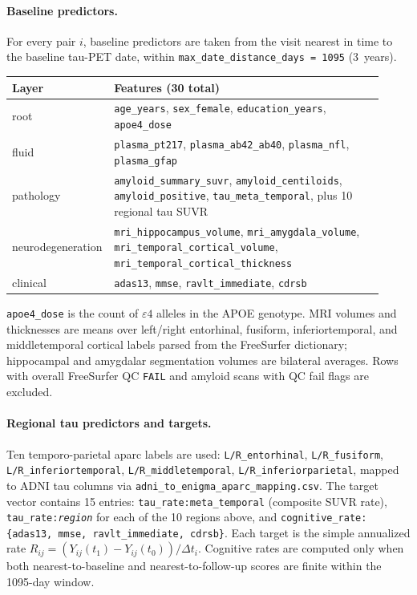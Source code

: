 \documentclass[11pt]{article}
\newcommand{\code}[1]{\texttt{#1}}
\begin{document}
\paragraph{Baseline predictors.} For every pair $i$, baseline predictors are
taken from the visit nearest in time to the baseline tau-PET date, within
\code{max\_date\_distance\_days = 1095} (3~years).

\begin{table}[h]
\centering
\small
\begin{tabular}{>{\raggedright}p{0.20\linewidth} p{0.72\linewidth}}
\toprule
\textbf{Layer} & \textbf{Features (30 total)} \\
\midrule
root & \code{age\_years}, \code{sex\_female}, \code{education\_years}, \code{apoe4\_dose} \\
fluid & \code{plasma\_pt217}, \code{plasma\_ab42\_ab40}, \code{plasma\_nfl}, \code{plasma\_gfap} \\
pathology & \code{amyloid\_summary\_suvr}, \code{amyloid\_centiloids}, \code{amyloid\_positive}, \code{tau\_meta\_temporal}, plus 10 regional tau SUVR \\
neurodegeneration & \code{mri\_hippocampus\_volume}, \code{mri\_amygdala\_volume}, \code{mri\_temporal\_cortical\_volume}, \code{mri\_temporal\_cortical\_thickness} \\
clinical & \code{adas13}, \code{mmse}, \code{ravlt\_immediate}, \code{cdrsb} \\
\bottomrule
\end{tabular}
\end{table}

\code{apoe4\_dose} is the count of $\varepsilon 4$ alleles in the APOE
genotype. MRI volumes and thicknesses are means over left/right entorhinal,
fusiform, inferiortemporal, and middletemporal cortical labels parsed from
the FreeSurfer dictionary; hippocampal and amygdalar segmentation volumes
are bilateral averages. Rows with overall FreeSurfer QC \code{FAIL} and
amyloid scans with QC fail flags are excluded.

\paragraph{Regional tau predictors and targets.} Ten temporo-parietal aparc
labels are used: \code{L/R\_entorhinal}, \code{L/R\_fusiform},
\code{L/R\_inferiortemporal}, \code{L/R\_middletemporal},
\code{L/R\_inferiorparietal}, mapped to ADNI tau columns via
\code{adni\_to\_enigma\_aparc\_mapping.csv}. The target vector contains 15
entries: \code{tau\_rate:meta\_temporal} (composite SUVR rate),
\code{tau\_rate:\textit{region}} for each of the 10 regions above, and
\code{cognitive\_rate:\{adas13, mmse, ravlt\_immediate, cdrsb\}}. Each
target is the simple annualized rate $R_{ij} = (Y_{ij}(t_1) -
Y_{ij}(t_0))/\Delta t_i$. Cognitive rates are computed only when both
nearest-to-baseline and nearest-to-follow-up scores are finite within the
1095-day window.
\end{document}
